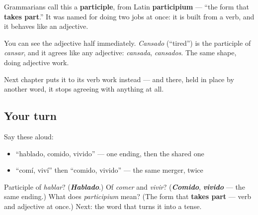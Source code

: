 \begin{cousinweb}
Grammarians call this a \textbf{participle}, from Latin \textbf{participium} — \textquotedblleft{}the form that \textbf{takes part}.\textquotedblright{} It was named for doing two jobs at once: it is built from a verb, and it behaves like an adjective.

You can see the adjective half immediately. \emph{Cansado} (\textquotedblleft{}tired\textquotedblright{}) is the participle of \emph{cansar}, and it agrees like any adjective: \emph{cansada}, \emph{cansados}. The same shape, doing adjective work.

Next chapter puts it to its verb work instead — and there, held in place by another word, it stops agreeing with anything at all.
\end{cousinweb}

\subsection*{Your turn}
Say these aloud:

\begin{itemize}
\raggedright
  \item \textquotedblleft{}hablado, comido, vivido\textquotedblright{} — one ending, then the shared one
  \item \textquotedblleft{}comí, viví\textquotedblright{} then \textquotedblleft{}comido, vivido\textquotedblright{} — the same merger, twice
\end{itemize}

\begin{tcolorbox}[breakable,colback=teal!4,colframe=teal!35!black,title={Before you move on}]
Participle of \emph{hablar}? (\emph{\textbf{Hablado}}.) Of \emph{comer} and \emph{vivir}? (\emph{\textbf{Comido}}, \emph{\textbf{vivido}} — the same ending.) What does \emph{participium} mean? (The form that \textbf{takes part} — verb and adjective at once.) Next: the word that turns it into a tense.
\end{tcolorbox}
